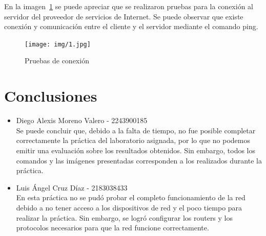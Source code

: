     En la imagen~\ref{fig:Pruebas_conexion} se puede apreciar que se realizaron pruebas para la conexión al servidor del proveedor de servicios de Internet. Se puede observar que existe conexión y comunicación entre el cliente y el servidor mediante el comando ping.

    \begin{figure}[H]
        \centering
        \texttt{[image: img/1.jpg]}
        \caption{Pruebas de conexión}
        \label{fig:Pruebas_conexion}
    \end{figure}

\section{Conclusiones}

\begin{itemize}
    \item Diego Alexis Moreno Valero - 2243900185\\
    Se puede concluir que, debido a la falta de tiempo, no fue posible completar correctamente la práctica del laboratorio asignada, por lo que no podemos emitir una evaluación sobre los resultados obtenidos. Sin embargo, todos los comandos y las imágenes presentadas corresponden a los realizados durante la práctica.
    \item Luis Ángel Cruz Díaz - 2183038433 \\
    En esta práctica no se pudó probar el completo funcionamiento de la red debido a no tener acceso a los dispositivos de red y el poco tiempo para realizar la práctica. Sin embargo, se logró configurar los routers y los protocolos necesarios para que la red funcione correctamente.
\end{itemize}



